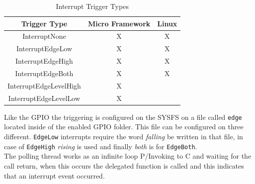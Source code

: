 \begin{table}[htb]
\begin{center}
\begin{tabular}{|c|c|c|}
\hline
{\bf Trigger Type} & {\bf Micro Framework} & {\bf Linux}  \\ \hline \hline
InterruptNone        & X    & X       \\ \hline
InterruptEdgeLow        & X    & X       \\ \hline
InterruptEdgeHigh        & X    & X       \\ \hline
InterruptEdgeBoth        & X    & X       \\ \hline
InterruptEdgeLevelHigh        & X    &        \\ \hline
InterruptEdgeLevelLow        & X    &        \\ \hline
\end{tabular}
\caption{Interrupt Trigger Types}
\label{T:Interrupt-Trigger-Types}
\end{center}
\end{table}

Like the GPIO the triggering is configured on the SYSFS on a file called \verb!edge! located inside of the enabled GPIO folder. This file can be configured on three different. \verb!EdgeLow! interrupts require the word \textit{falling} be written in that file, in case of \verb!EdgeHigh! \textit{rising} is used and finally \textit{both} is for \verb!EdgeBoth!.
\\
The polling thread works as an infinite loop P/Invoking to C and waiting for the call return, when this occurs the delegated function is called and this indicates that an interrupt event occurred.

